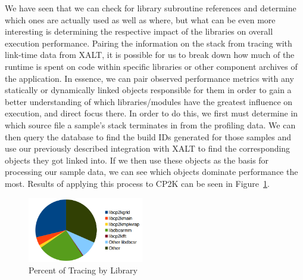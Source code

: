 We have seen that we can check for library subroutine references and determine which ones are actually used as well as where, but what can be even more interesting is determining the respective impact of the libraries on overall execution performance.
Pairing the information on the stack from tracing with link-time data from XALT, it is possible for us to break down how much of the runtime is spent on code within specific libraries or other component archives of the application.
In essence, we can pair observed performance metrics with any statically or dynamically linked objects responsible for them in order to gain a better understanding of which libraries/modules have the greatest influence on execution, and direct focus there.
In order to do this, we first must determine in which source file a sample's stack terminates in from the profiling data.
We can then query the database to find the build IDs generated for those samples and use our previously described integration with XALT to find the corresponding objects they got linked into.
If we then use these objects as the basis for processing our sample data, we can see which objects dominate performance the most.
Results of applying this process to CP2K can be seen in Figure~\ref{fig:library-performance}.

\begin{figure}
\begin{center}
\includegraphics[width=0.45\textwidth]{images/library-performance.png}
\end{center}
\caption{Percent of Tracing by Library}
\label{fig:library-performance}
\end{figure}
